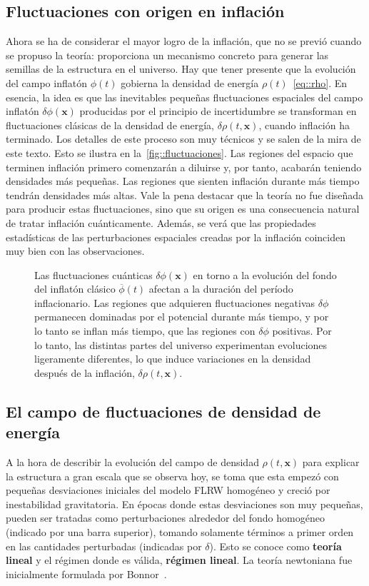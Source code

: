 \subsection{Fluctuaciones con origen en inflación}
Ahora se ha de considerar el mayor logro de la inflación, que no se previó cuando se propuso la teoría: proporciona un mecanismo concreto para generar las semillas de la estructura en el universo. Hay que tener presente que la evolución del campo inflatón \(\phi(t)\) gobierna la densidad de energía \(\rho(t)\)~\eqref{eq::rho}. En esencia, la idea es que las inevitables pequeñas fluctuaciones espaciales del campo inflatón \(\delta\phi(\symbf{x})\) producidas por el principio de incertidumbre se transforman en fluctuaciones clásicas de la densidad de energía, \(\delta\rho(t,\symbf{x})\), cuando inflación ha terminado. Los detalles de este proceso son muy técnicos y se salen de la mira de este texto. Esto se ilustra en la~\autoref{fig::fluctuaciones}. Las regiones del espacio que terminen inflación primero comenzarán a diluirse y, por tanto, acabarán teniendo densidades más pequeñas. Las regiones que sienten inflación durante más tiempo tendrán densidades más altas. Vale la pena destacar que la teoría no fue diseñada para producir estas fluctuaciones, sino que su origen es una consecuencia natural de tratar inflación cuánticamente. Además, se verá que las propiedades estadísticas de las perturbaciones espaciales creadas por la inflación coinciden muy bien con las observaciones.
\begin{figure}
    \centering
    \def\svgwidth{0.75\textwidth}
    
    \caption[Fluctuaciones cuánticas a clásicas]{Las fluctuaciones cuánticas \(\delta\phi(\symbf{x})\) en torno a la evolución del fondo del inflatón clásico \(\overbar{\phi}(t)\) afectan a la duración del período inflacionario. Las regiones que adquieren fluctuaciones negativas \(\delta\phi\) permanecen dominadas por el potencial durante más tiempo, y por lo tanto se inflan más tiempo, que las regiones con \(\delta\phi\) positivas. Por lo tanto, las distintas partes del universo experimentan evoluciones ligeramente diferentes, lo que induce variaciones en la densidad después de la inflación, \(\delta\rho(t,\symbf{x})\).}
    \label{fig::fluctuaciones}
\end{figure}
\subsection{El campo de fluctuaciones de densidad de energía}
A la hora de describir la evolución del campo de densidad \(\rho(t,\symbf{x})\) para explicar la estructura a gran escala que se observa hoy, se toma que esta empezó con pequeñas desviaciones iniciales del modelo FLRW homogéneo y creció por inestabilidad gravitatoria. En épocas donde estas desviaciones son muy pequeñas, pueden ser tratadas como perturbaciones alrededor del fondo homogéneo (indicado por una barra superior), tomando solamente términos a primer orden en las cantidades perturbadas (indicadas por \(\delta\)). Esto se conoce como \textbf{teoría lineal} y el régimen donde es válida, \textbf{régimen lineal}. La teoría newtoniana fue inicialmente formulada por Bonnor~\cite{bonnor1957jeans}.

